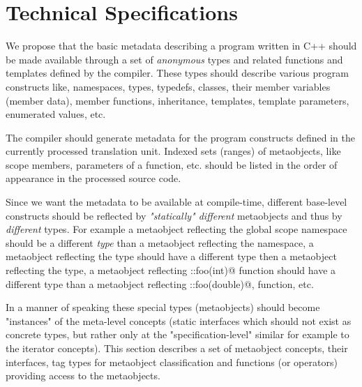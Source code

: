 \section{Technical Specifications}
\label{section-tech-spec}

We propose that the basic metadata describing a program written
in C++ should be made available through a set of {\em anonymous} types
and related functions and templates
defined by the compiler. These types should describe various program
constructs like, namespaces, types, typedefs, classes, their member variables
(member data), member functions, inheritance, templates, template parameters,
enumerated values, etc.

The compiler should generate metadata for the program constructs defined
in the currently processed translation unit. Indexed sets (ranges) of metaobjects,
like scope members, parameters of a function, etc. should be listed
in the order of appearance in the processed source code.

Since we want the metadata to be available at compile-time,
different base-level constructs should be reflected by
{\em "statically" different} metaobjects and thus by {\em different} types.
For example a metaobject reflecting the global scope namespace should
be a different {\em type} than a metaobject reflecting the \verb@std@
namespace, a metaobject reflecting the \verb@int@ type should
have a different type then a metaobject reflecting the \verb@double@
type, a metaobject reflecting \verb@::foo(int)@ function should
have a different type than a metaobject reflecting \verb@::foo(double)@,
function, etc.

In a manner of speaking these special types (metaobjects) should become
"instances" of the meta-level concepts (static interfaces which
should not exist as concrete types, but rather only at the
"specification-level" similar for example to the iterator concepts).
This section describes a set of metaobject concepts,
their interfaces, tag types for metaobject classification and
functions (or operators) providing access to the metaobjects.




%
